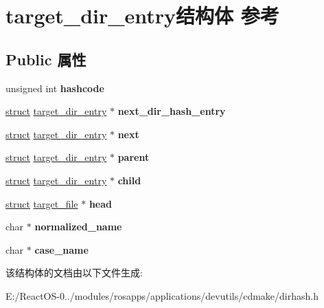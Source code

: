 \hypertarget{structtarget__dir__entry}{}\section{target\+\_\+dir\+\_\+entry结构体 参考}
\label{structtarget__dir__entry}
\subsection*{Public 属性}
\begin{DoxyCompactItemize}
\item 
\mbox{\label{structtarget__dir__entry_a11770e6bbf10fa7be15d0b68872a0e3d}} 
unsigned int {\bfseries hashcode}
\item 
\mbox{\label{structtarget__dir__entry_a7404a12c9b2a3f4768e228f64786fd71}} 
\hyperlink{interfacestruct}{struct} \hyperlink{structtarget__dir__entry}{target\+\_\+dir\+\_\+entry} $\ast$ {\bfseries next\+\_\+dir\+\_\+hash\+\_\+entry}
\item 
\mbox{\label{structtarget__dir__entry_acb7ad926654926114152d97b0e70359b}} 
\hyperlink{interfacestruct}{struct} \hyperlink{structtarget__dir__entry}{target\+\_\+dir\+\_\+entry} $\ast$ {\bfseries next}
\item 
\mbox{\label{structtarget__dir__entry_a4aaa737c150264a61826e9fb9babbf55}} 
\hyperlink{interfacestruct}{struct} \hyperlink{structtarget__dir__entry}{target\+\_\+dir\+\_\+entry} $\ast$ {\bfseries parent}
\item 
\mbox{\label{structtarget__dir__entry_a60d3d2834fe7d6e504a3fe2cab444637}} 
\hyperlink{interfacestruct}{struct} \hyperlink{structtarget__dir__entry}{target\+\_\+dir\+\_\+entry} $\ast$ {\bfseries child}
\item 
\mbox{\label{structtarget__dir__entry_a49b2abe58c3982fd2c69618d6f992a4d}} 
\hyperlink{interfacestruct}{struct} \hyperlink{structtarget__file}{target\+\_\+file} $\ast$ {\bfseries head}
\item 
\mbox{\label{structtarget__dir__entry_a6041cd0832dfc89fd3070d0ea652d3fe}} 
char $\ast$ {\bfseries normalized\+\_\+name}
\item 
\mbox{\label{structtarget__dir__entry_a687686817202491a1e7a863c46db1339}} 
char $\ast$ {\bfseries case\+\_\+name}
\end{DoxyCompactItemize}


该结构体的文档由以下文件生成\+:\begin{DoxyCompactItemize}
\item 
E\+:/\+React\+O\+S-\/0../modules/rosapps/applications/devutils/cdmake/dirhash.\+h\end{DoxyCompactItemize}
